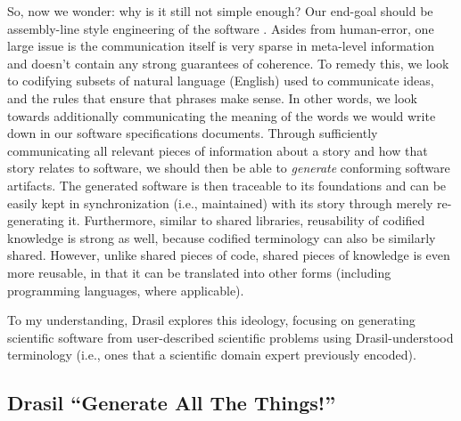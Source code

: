 So, now we wonder: why is it still not simple enough? Our end-goal should be
assembly-line style engineering of the software \cite{well-understood}. Asides
from human-error, one large issue is the communication itself is very sparse in
meta-level information and doesn't contain any strong guarantees of coherence.
To remedy this, we look to codifying subsets of natural language (English) used
to communicate ideas, and the rules that ensure that phrases make sense. In
other words, we look towards additionally communicating the meaning of the words
we would write down in our software specifications documents. Through
sufficiently communicating all relevant pieces of information about a story and
how that story relates to software, we should then be able to \textit{generate}
conforming software artifacts. The generated software is then traceable to its
foundations and can be easily kept in synchronization (i.e., maintained) with
its story through merely re-generating it. Furthermore, similar to shared
libraries, reusability of codified knowledge is strong as well, because codified
terminology can also be similarly shared. However, unlike shared pieces of code,
shared pieces of knowledge is even more reusable, in that it can be translated
into other forms (including programming languages, where applicable).

To my understanding, Drasil \cite{Drasil2021} explores this ideology, focusing
on generating scientific software from user-described scientific problems using
Drasil-understood terminology (i.e., ones that a scientific domain expert
previously encoded).

\subsection{Drasil \textemdash{} ``Generate All The Things!''}

\drasilLogoImg{}

